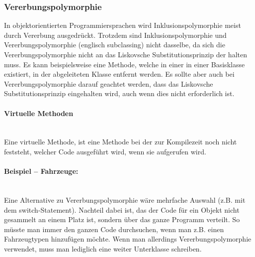 		\subsubsection{Vererbungspolymorphie}
			In objektorientierten Programmiersprachen wird Inklusionspolymorphie meist durch Vererbung ausgedrückt.
			Trotzdem sind Inklusionspolymorphie und Vererbungspolymorphie (englisch subclassing) nicht dasselbe, da sich
			die Vererbungspolymorphie nicht an das Liskovsche Substitutionsprinzip der halten muss. Es kann beispielsweise
			eine Methode, welche in einer in einer Basisklasse existiert, in der abgeleiteten Klasse entfernt werden. Es
			sollte aber auch bei Vererbungspolymorphie darauf geachtet werden, dass das Liskovsche Substitutionsprinzip
			eingehalten wird, auch wenn dies nicht erforderlich ist.
			
			\paragraph{Virtuelle Methoden}\mbox{}\\
				Eine virtuelle Methode, ist eine Methode bei der zur Kompilezeit noch nicht feststeht, welcher Code ausgeführt
				wird, wenn sie aufgerufen wird.
			
			\paragraph*{Beispiel -- Fahrzeuge:}\mbox{}\\
				\UseRawInputEncoding{}
				Eine Alternative zu Vererbungspolymorphie wäre mehrfache Auswahl (z.B. mit dem switch-Statement). Nachteil dabei
				ist, das der Code für ein Objekt nicht gesammelt an einem Platz ist, sondern über das ganze Programm verteilt.
				So müsste man immer den ganzen Code durchsuchen, wenn man z.B. einen Fahrzeugtypen hinzufügen möchte. Wenn man
				allerdings Vererbungspolymorphie verwendet, muss man lediglich eine weiter Unterklasse schreiben.
				
				\UseRawInputEncoding{}
				
			
